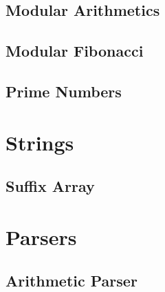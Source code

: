 \documentclass[10pt,landscape,twocolumn,a4paper,notitlepage]{article}
\begin{document}
  \subsection{Modular Arithmetics}
  

  \subsection{Modular Fibonacci}
  

  \subsection{Prime Numbers}
  

\section{Strings}

  \subsection{Suffix Array}
  

\section{Parsers}

  \subsection{Arithmetic Parser}
  



% 
% 
% 

% 
\end{document}
